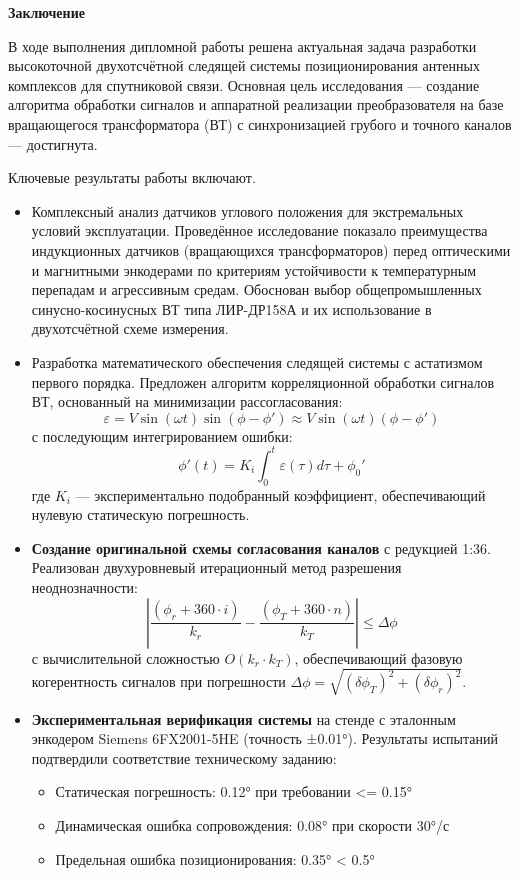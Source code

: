 \newpage

\begin{center}
  \textbf{\large Заключение}
\end{center}

В ходе выполнения дипломной работы решена актуальная задача разработки высокоточной двухотсчётной следящей системы позиционирования антенных комплексов 
для спутниковой связи. Основная цель исследования — создание алгоритма обработки сигналов и аппаратной реализации преобразователя на базе вращающегося
трансформатора (ВТ) с синхронизацией грубого и точного каналов — достигнута. 

Ключевые результаты работы включают.
\begin{itemize}

\item Комплексный анализ датчиков углового положения для экстремальных условий эксплуатации. 
Проведённое исследование показало преимущества индукционных датчиков (вращающихся трансформаторов) перед оптическими и магнитными энкодерами 
по критериям устойчивости к температурным перепадам и агрессивным средам. Обоснован выбор общепромышленных синусно-косинусных ВТ типа ЛИР-ДР158А и 
их использование в двухотсчётной схеме измерения.

\item Разработка математического обеспечения следящей системы с астатизмом первого порядка. 
Предложен алгоритм корреляционной обработки сигналов ВТ, основанный на минимизации рассогласования:
\[
\varepsilon = V \sin(\omega t) \sin(\phi - \phi') \approx V \sin(\omega t)(\phi - \phi')
\]
с последующим интегрированием ошибки:
\[
\phi'(t) = K_i \int_0^t \varepsilon(\tau)d\tau + \phi_0'
\]
где $K_i$ — экспериментально подобранный коэффициент, обеспечивающий нулевую статическую погрешность.

\item \textbf{Создание оригинальной схемы согласования каналов} с редукцией 1:36. Реализован двухуровневый итерационный метод разрешения неоднозначности:
\[
\left| \frac{(\phi_r + 360 \cdot i)}{k_r} - \frac{(\phi_T + 360 \cdot n)}{k_T} \right| \leq \Delta \phi
\]
с вычислительной сложностью $O(k_r \cdot k_T)$, обеспечивающий фазовую когерентность сигналов при погрешности $\Delta \phi = \sqrt{(\delta \phi_T)^2 + (\delta \phi_r)^2}$.

\item \textbf{Экспериментальная верификация системы} на стенде с эталонным энкодером Siemens 6FX2001-5HE (точность ±0.01°). Результаты испытаний подтвердили соответствие техническому заданию:
\begin{itemize}
    \item Статическая погрешность: 0.12° при требовании <= 0.15°
    \item Динамическая ошибка сопровождения: 0.08° при скорости 30°/с
    \item Предельная ошибка позиционирования: 0.35° < 0.5°
\end{itemize}

\end{itemize}

